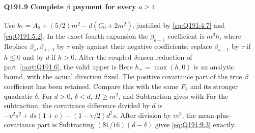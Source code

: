 \paragraph{Q191.9 Complete $\beta$ payment for every $a\ge\allowbreak 4$}\label{part:Q191.9}
Use $k_*=\allowbreak A_0+(5/2)m^2-d(C_0+2m^2)$, justified by
\eqref{eq:Q191:4.7} and \eqref{eq:Q191:5.2}. In the exact fourth
expansion the $\beta_{a-1}$ coefficient is $m^3h$, where
Replace $\beta_a,\allowbreak \beta_{a+1}$ by $\tau$ only against their negative
coefficients; replace $\beta_{a-1}$ by $\tau$ if $h\le\allowbreak 0$ and by $d$
if $h>\allowbreak 0$. After the coupled Jensen reduction of part~\ref{part:Q191.6},
the valid upper is
Here $h_+=\allowbreak \max(h,\allowbreak 0)$ is an analytic bound, with the actual direction fixed.
The positive covariance part of the true $\beta$ coefficient has been retained.
Compare this with the same $F_3$ and its stronger quadratic $\delta$.
For $d>\allowbreak 0$, $\delta<\allowbreak d$, $H\ge\allowbreak  m^2$, and
Subtraction gives
with
For the subtraction, the covariance difference divided by $d$ is
$-v^2s^2+ds(1+v)-(1-v/2)d^2s$. After division by $m^3$, the
mean-plus-covariance part is
Subtracting $(81/16)(d-\delta)$ gives \eqref{eq:Q191:9.3} exactly.

